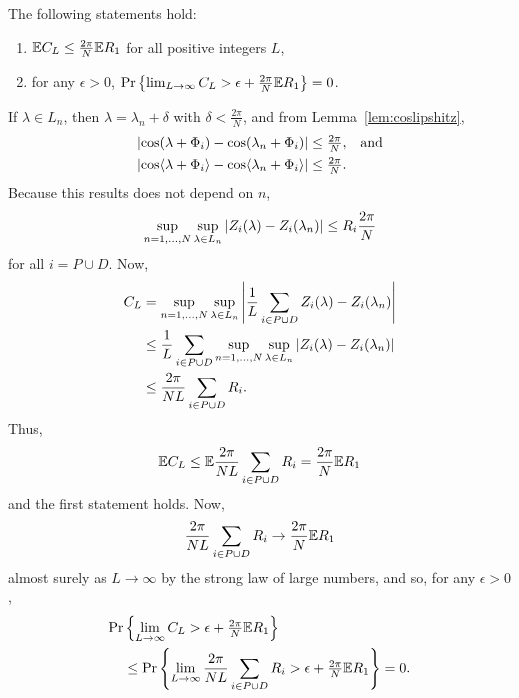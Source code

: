 \documentclass[journal]{IEEEtran}
\begin{document}
\begin{lemma}\label{lem:CL} The following statements hold:
\begin{enumerate}
\item ${\mathbb E} C_L \leq \tfrac{2\pi}{N}{\mathbb E} R_1$ for all positive integers $L$,
\item for any $\epsilon > 0$, ${\operatorname{Pr}}\left\{ \lim_{L \rightarrow \infty} C_L > \epsilon + \tfrac{2\pi}{N}{\mathbb E} R_1 \right\} = 0$.
\end{enumerate}
\end{lemma}
\begin{IEEEproof}
If $\lambda \in L_n$, then $\lambda = \lambda_n + \delta$ with $\delta < \tfrac{2\pi}{N}$, and from Lemma~\ref{lem:coslipshitz},
\begin{align*}
&{\left\vert \cos(\lambda + \Phi_i) - \cos(\lambda_n + \Phi_i) \right\vert} \leq \tfrac{2\pi}{N}, \;\;\; \text{and} \\
&{\left\vert \cos\langle \lambda + \Phi_i \rangle - \cos\langle \lambda_n + \Phi_i \rangle \right\vert} \leq \tfrac{2\pi}{N}.
\end{align*}
Because this results does not depend on $n$,
\[
\sup_{n=1,\dots,N}\sup_{\lambda \in L_n} {\left\vert Z_i(\lambda) - Z_i(\lambda_n) \right\vert} \leq R_i \frac{2\pi}{N}
\]
for all $i = P \cup D$.  Now,
\begin{align*}
C_L &= \sup_{n=1,\dots,N}\sup_{\lambda \in L_n}{\left\vert \frac{1}{L}\sum_{i \in P \cup D} Z_i(\lambda) - Z_i(\lambda_n) \right\vert} \\
&\leq \frac{1}{L}\sum_{i \in P \cup D} \sup_{n=1,\dots,N}\sup_{\lambda \in L_n} {\left\vert Z_i(\lambda) - Z_i(\lambda_n) \right\vert} \\
&\leq \frac{2\pi}{N L}\sum_{i \in P \cup D} R_i .
\end{align*}
Thus, 
\[
{\mathbb E} C_L \leq {\mathbb E} \frac{2\pi}{N L}\sum_{i \in P \cup D} R_i = \frac{2\pi}{N}{\mathbb E} R_1
\]
and the first statement holds.  Now, 
\[
\frac{2\pi}{N L}\sum_{i \in P \cup D} R_i \rightarrow \frac{2\pi}{N}{\mathbb E} R_1
\] 
almost surely as $L \rightarrow\infty$ by the strong law of large numbers, and so, for any $\epsilon > 0$,
\begin{align*}
{\operatorname{Pr}}&\left\{ \lim_{L \rightarrow \infty} C_L > \epsilon + \tfrac{2\pi}{N}{\mathbb E} R_1 \right\} \\
&\leq {\operatorname{Pr}}\left\{ \lim_{L \rightarrow \infty} \frac{2\pi}{N L}\sum_{i \in P \cup D} R_i > \epsilon + \tfrac{2\pi}{N}{\mathbb E} R_1 \right\} = 0.
\end{align*}
\end{IEEEproof}
\end{document}
